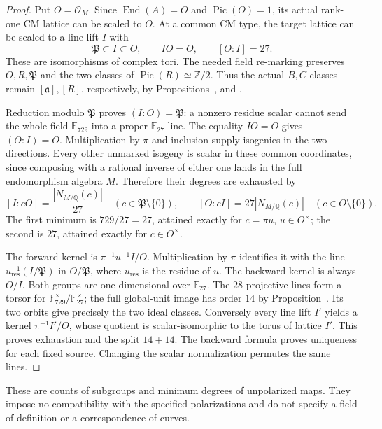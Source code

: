 \begin{proof}
Put $O=\mathcal O_M$. Since $\operatorname{End}(A)=O$ and
$\operatorname{Pic}(O)=1$, its actual rank-one CM lattice can be
scaled to $O$. At a common CM type, the target lattice can be
scaled to a line lift $I$ with
\[
 \mathfrak P\subset I\subset O,\qquad IO=O,\qquad [O:I]=27.
\]
These are isomorphisms of complex tori. The needed field re-marking
preserves $O,R,\mathfrak P$ and the two classes of
$\operatorname{Pic}(R)\simeq\mathbb Z/2$.
Thus the actual $B,C$ classes remain $[\mathfrak a],[R]$, respectively, by
Propositions~,
 and .

Reduction modulo $\mathfrak P$ proves
$(I:O)=\mathfrak P$: a nonzero residue scalar cannot send the
whole field $\mathbb F_{729}$ into a proper
$\mathbb F_{27}$-line. The equality $IO=O$ gives $(O:I)=O$.
Multiplication by $\pi$ and inclusion supply isogenies in the two
directions. Every other unmarked isogeny is scalar in these common
coordinates, since composing with a rational inverse of either one
lands in the full endomorphism algebra $M$. Therefore their degrees
are exhausted by
\[
 [I:cO]=\frac{|N_{M/\mathbb Q}(c)|}{27}
 \quad(c\in\mathfrak P\setminus\{0\}),\qquad
 [O:cI]=27|N_{M/\mathbb Q}(c)|
 \quad(c\in O\setminus\{0\}).
\]
The first minimum is $729/27=27$, attained exactly for
$c=\pi u$, $u\in O^\times$; the second is $27$, attained
exactly for $c\in O^\times$.

The forward kernel is $\pi^{-1}u^{-1}I/O$. Multiplication by
$\pi$ identifies it with the line $u_{\mathrm{res}}^{-1}(I/\mathfrak P)$
in $O/\mathfrak P$, where $u_{\mathrm{res}}$ is the residue of $u$.
The backward kernel is always
$O/I$. Both groups are one-dimensional over $\mathbb F_{27}$.
The $28$ projective lines form a torsor for
$\mathbb F_{729}^{\times}/\mathbb F_{27}^{\times}$; the full
global-unit image has order $14$ by
Proposition~. Its two orbits give precisely
the two ideal classes. Conversely every line lift $I'$ yields a
kernel $\pi^{-1}I'/O$, whose quotient is scalar-isomorphic to the
torus of lattice $I'$. This proves exhaustion and the split
$14+14$. The backward formula proves uniqueness for each fixed
source. Changing the scalar normalization permutes the same lines.
\end{proof}

These are counts of subgroups and minimum degrees of unpolarized
maps. They impose no compatibility with the specified polarizations
and do not specify a field of definition or a correspondence of curves.


